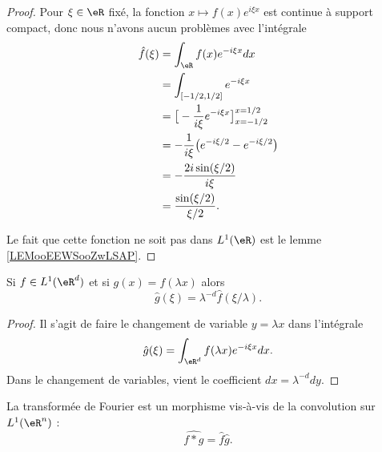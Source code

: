 \begin{proof}
    Pour \( \xi\in \eR\) fixé, la fonction \( x\mapsto f(x) e^{i\xi x}\) est continue à support compact, donc nous n'avons aucun problèmes avec l'intégrale
    \begin{subequations}
        \begin{align}
            \hat f(\xi)&=\int_{\eR}f(x) e^{-i\xi x}dx\\
            &=\int_{\mathopen[ -1/2 , 1/2 \mathclose]} e^{-i\xi x}\\
            &=\big[ -\frac{1}{ i\xi } e^{-i\xi x} \big]_{x=-1/2}^{x=1/2}\\
            &=-\frac{1}{ i\xi }\big(  e^{-i\xi /2}- e^{-i\xi /2} \big)\\
            &=-\frac{ 2i\sin(\xi/2) }{ i\xi }\\
            &=\frac{ \sin(\xi/2) }{ \xi/2 }.
        \end{align}
    \end{subequations}

    Le fait que cette fonction ne soit pas dans \( L^1(\eR)\) est le lemme \ref{LEMooEEWSooZwLSAP}.
\end{proof}

\begin{lemma}       \label{LEMooKGDKooVXSMCn}
    Si \( f\in L^1(\eR^d)\) et si \( g(x)=f(\lambda x)\) alors
    \begin{equation}
        \hat g(\xi)=\lambda^{-d}\hat f(\xi/\lambda).
    \end{equation}
\end{lemma}

\begin{proof}
    Il s'agit de faire le changement de variable \( y=\lambda x\) dans l'intégrale
    \begin{equation}
        \hat g(\xi)=\int_{\eR^d}f(\lambda x) e^{-i\xi x}dx.
    \end{equation}
    Dans le changement de variables, vient le coefficient \( dx=\lambda^{-d}dy\).
\end{proof}

\begin{proposition}     \label{PropfqvLOl}
    La transformée de Fourier est un morphisme vis-à-vis de la convolution sur \( L^1(\eR^n)\) :
    \begin{equation}
        \widehat{f*g}=\hat f\hat g.
    \end{equation}
\end{proposition}


